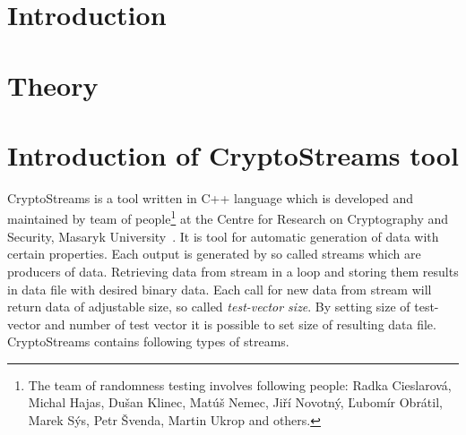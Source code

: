 \documentclass[
    digital,    %
    oneside,    %
    color,
    11pt,
    nocover,
    notable,
    nolof,
    nolot,
    final
]{fithesis3}
\begin{document}
\setlength{\parskip}{5pt}
\setlength{\parindent}{0pt}


\chapter{Introduction}
\label{chap:introduction}


\chapter{Theory}

\chapter{Introduction of CryptoStreams tool}
\label{chap:cryptostreams}

CryptoStreams is a tool written in C++ language which is developed and maintained by team of people\footnote{The team of randomness testing involves following people: Radka Cieslarová, Michal Hajas, Dušan Klinec, Matúš Nemec, Jiří Novotný, Ľubomír Obrátil, Marek Sýs, Petr Švenda, Martin Ukrop and others.} at the Centre for Research on Cryptography and Security, Masaryk University~\cite{CryptoStreams}. It is tool for automatic generation of data with certain properties. Each output is generated by so called streams which are producers of data. Retrieving data from stream in a loop and storing them results in data file with desired binary data. Each call for new data from stream will return data of adjustable size, so called \textit{test-vector size}. By setting size of test-vector and number of test vector it is possible to set size of resulting data file. CryptoStreams contains following types of streams.
\end{document}
